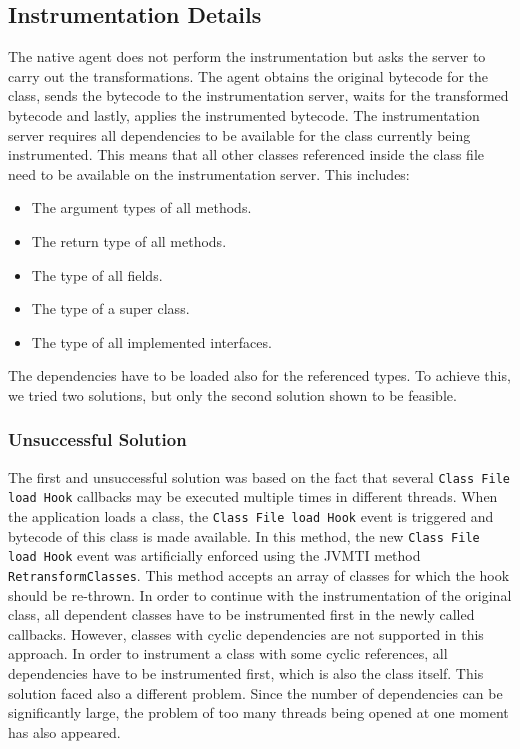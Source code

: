 \subsection{Instrumentation Details}
\label{imp:native:inst}
The native agent does not perform the instrumentation but asks the server to carry out the transformations. The agent obtains the original bytecode for the class, sends the bytecode to the instrumentation server, waits for the transformed bytecode and lastly, applies the instrumented bytecode. The instrumentation server requires all dependencies to be available for the class currently being instrumented. This means that all other classes referenced inside the class file need to be available on the instrumentation server. This includes:
\begin{itemize}
	\item The argument types of all methods.
	\item The return type of all methods.
	\item The type of all fields.
	\item The type of a super class.
	\item The type of all implemented interfaces.
\end{itemize}
The dependencies have to be loaded also for the referenced types. To achieve this, we tried two solutions, but only the second solution shown to be feasible.

\subsubsection{Unsuccessful Solution}
The first and unsuccessful solution was based on the fact that several \texttt{Class File load Hook} callbacks may be executed multiple times in different threads. When the application loads a class, the \texttt{Class File load Hook} event is triggered and bytecode of this class is made available. In this method, the new \texttt{Class File load Hook} event was artificially enforced using the JVMTI method \texttt{RetransformClasses}. This method accepts an array of classes for which the hook should be re-thrown. In order to continue with the instrumentation of the original class, all dependent classes have to be instrumented first in the newly called callbacks. However, classes with cyclic dependencies are not supported in this approach. In order to instrument a class with some cyclic references, all dependencies have to be instrumented first, which is also the class itself. This solution faced also a different problem. Since the number of dependencies can be significantly large, the problem of too many threads being opened at one moment has also appeared. 

